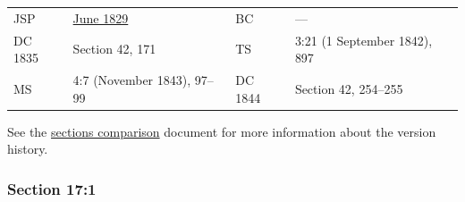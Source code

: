 		\begin{tabular}{p{1in}p{2in}p{1in}p{2in}}
			JSP		& \hyperref[EMS-1828-1829-JS-JUN-1829-E]{June 1829}	& BC & --- \\
			DC 1835	& Section 42, 171									& TS & 3:21 (1 September 1842), 897 \\
			MS		& 4:7 (November 1843), 97--99						& DC 1844 & Section 42, 254--255 \\
		\end{tabular}
		
		\medskip
		
		See the \href{https://drive.google.com/file/d/1goAvNz8jS4R8slYfMG_db55Ty2z_vmgK/view?usp=sharing}{sections comparison} document for more information about the version history.

	\subsubsection{Section 17:1} %
		\label{DC17-1}

